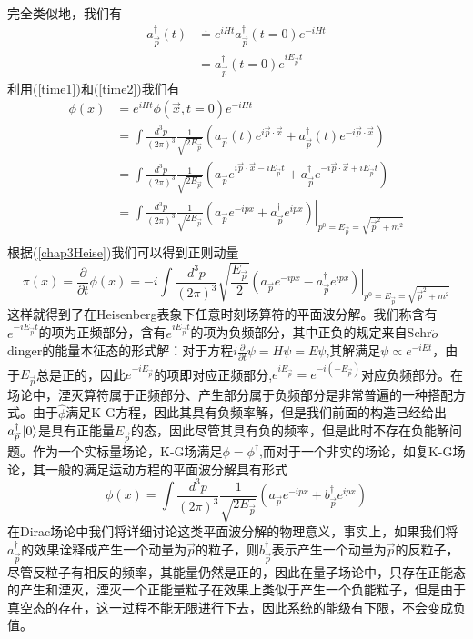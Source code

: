 完全类似地，我们有
\begin{equation}
\label{time2}
    \begin{aligned}
        a_{\vec{p}}^{\dagger}(t)&\doteq e^{iHt}a_{\vec{p}}^{\dagger}(t=0)e^{-iHt}\\
   &=a_{\vec{p}}^{\dagger}(t=0)e^{iE_{\vec{p}}t}
    \end{aligned}
\end{equation}
利用(\ref{time1})和(\ref{time2})我们有
\begin{equation}
\label{chap3phi4D}
\begin{aligned}
    \phi(x)&=e^{iHt}\phi(\vec{x},t=0)e^{-iHt}\\
    &=\int \frac{d^{3}p}{(2\pi)^{3}}\frac{1}{\sqrt{2E_{\vec{p}}}}\left(a_{\vec{p}}(t)e^{i\vec{p}\cdot\vec{x}}+a^{\dagger}_{\vec{p}}(t)e^{-i\vec{p}\cdot\vec{x}}\right)\\
    &=\int \frac{d^{3}p}{(2\pi)^{3}}\frac{1}{\sqrt{2E_{\vec{p}}}}\left(a_{\vec{p}}e^{i\vec{p}\cdot\vec{x}-iE_{\vec{p}}t}+a^{\dagger}_{\vec{p}}e^{-i\vec{p}\cdot\vec{x}+iE_{\vec{p}}t}\right)\\
      &=\int \frac{d^{3}p}{(2\pi)^{3}}\frac{1}{\sqrt{2E_{\vec{p}}}}\left.\left(a_{\vec{p}}e^{-ipx}+a^{\dagger}_{\vec{p}}e^{ipx}\right)\right|_{p^{0}=E_{\vec{p}}=\sqrt{\vec{p}^{2}+m^{2}}}\\
    \end{aligned}
\end{equation}
根据(\ref{chap3Heise})我们可以得到正则动量
\begin{equation}
\pi(x)=\frac{\partial}{\partial t}\phi(x)=-i\int \frac{d^{3}p}{(2\pi)^{3}}\sqrt{\frac{E_{\vec{p}}}{2}}\left.\left(a_{\vec{p}}e^{-ipx}-a^{\dagger}_{\vec{p}}e^{ipx}\right)\right|_{p^{0}=E_{\vec{p}}=\sqrt{\vec{p}^{2}+m^{2}}}
\end{equation}
这样就得到了在Heisenberg表象下任意时刻场算符的平面波分解。我们称含有$e^{-iE_{\vec{p}}t}$的项为正频部分，含有$e^{iE_{\vec{p}}t}$的项为负频部分，其中正负的规定来自Schr$\ddot{o}$dinger的能量本征态的形式解：对于方程$i\frac{\partial}{\partial t}\psi=H\psi=E\psi$,其解满足$\psi \propto e^{-iEt}$，由于$E_{\vec{p}}$总是正的，因此$e^{-iE_{\vec{p}}}$的项即对应正频部分,$e^{iE_{\vec{p}}}=e^{-i(-E_{\vec{p}})}$对应负频部分。在场论中，湮灭算符属于正频部分、产生部分属于负频部分是非常普遍的一种搭配方式。由于$\hat{\phi}$满足K-G方程，因此其具有负频率解，但是我们前面的构造已经给出$a_{\vec{p}}^{\dagger}\ket{0}$是具有正能量$E_{\vec{p}}$的态，因此尽管其具有负的频率，但是此时不存在负能解问题。作为一个实标量场论，K-G场满足$\phi=\phi^{\dagger}$,而对于一个非实的场论，如复K-G场论，其一般的满足运动方程的平面波分解具有形式
\begin{equation}
\label{chap3CKGfenjie}
    \phi(x)=\int \frac{d^{3}p}{(2\pi)^{3}}\frac{1}{\sqrt{2E_{\vec{p}}}}\left(a_{\vec{p}}e^{-ipx}+b^{\dagger}_{\vec{p}}e^{ipx}\right)
\end{equation}
在Dirac场论中我们将详细讨论这类平面波分解的物理意义，事实上，如果我们将$a^{\dagger}_{\vec{p}}$的效果诠释成产生一个动量为$\vec{p}$的粒子，则$b^{\dagger}_{\vec{p}}$表示产生一个动量为$\vec{p}$的反粒子，尽管反粒子有相反的频率，其能量仍然是正的，因此在量子场论中，只存在正能态的产生和湮灭，湮灭一个正能量粒子在效果上类似于产生一个负能粒子，但是由于真空态的存在，这一过程不能无限进行下去，因此系统的能级有下限，不会变成负值。

